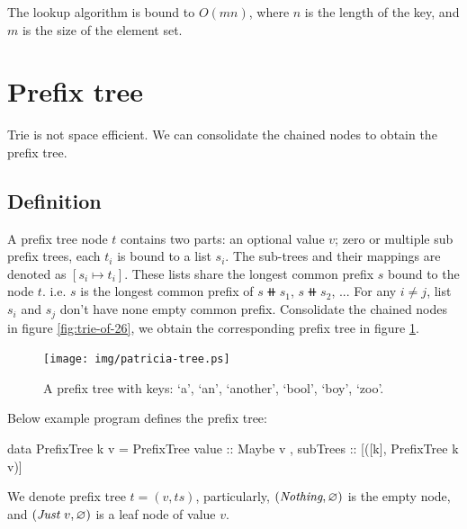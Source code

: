 \documentclass[b5paper]{article}
\begin{document}
The lookup algorithm is bound to $O(mn)$, where $n$ is the length of the key, and $m$ is the size of the element set.

\begin{Exercise}
\end{Exercise}

\section{Prefix tree}
 

Trie is not space efficient. We can consolidate the chained nodes to obtain the prefix tree.

\subsection{Definition}
A prefix tree node $t$ contains two parts: an optional value $v$; zero or multiple sub prefix trees, each $t_i$ is bound to a list $s_i$. The sub-trees and their mappings are denoted as $[s_i \mapsto t_i]$. These lists share the longest common prefix $s$ bound to the node $t$. i.e. $s$ is the longest common prefix of $s \doubleplus s_1$, $s \doubleplus s_2$, ... For any $i \neq j$, list $s_i$ and $s_j$ don't have none empty common prefix. Consolidate the chained nodes in figure \ref{fig:trie-of-26}, we obtain the corresponding prefix tree in figure \ref{fig:patricia-tree}.

\begin{figure}[htbp]
  \centering
  \texttt{[image: img/patricia-tree.ps]}
  \caption{A prefix tree with keys: `a', `an', `another', `bool', `boy', `zoo'.}
  \label{fig:patricia-tree}
\end{figure}

Below example program defines the prefix tree:

\begin{Haskell}
data PrefixTree k v = PrefixTree { value :: Maybe v
                                 , subTrees :: [([k], PrefixTree k v)]}
\end{Haskell}

We denote prefix tree $t = (v, ts)$, particularly, $(\textit{Nothing}, \varnothing)$ is the empty node, and $(\textit{Just}\ v, \varnothing)$ is a leaf node of value $v$.
\end{document}
